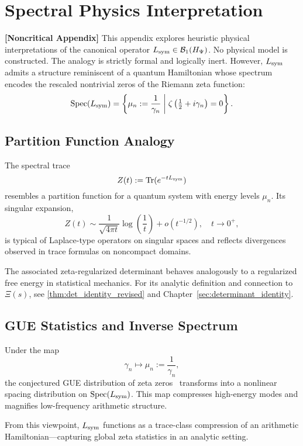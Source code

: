 \section{Spectral Physics Interpretation}
\label{app:spectral_physics_link}

\noindent\textbf{[Noncritical Appendix]}  
This appendix explores heuristic physical interpretations of the canonical operator \( L_{\mathrm{sym}} \in \mathcal{B}_1(H_{\Psi}) \). No physical model is constructed. The analogy is strictly formal and logically inert. However, \( L_{\mathrm{sym}} \) admits a structure reminiscent of a quantum Hamiltonian whose spectrum encodes the rescaled nontrivial zeros of the Riemann zeta function:
\[
\operatorname{Spec}(L_{\mathrm{sym}}) = \left\{ \mu_n := \frac{1}{\gamma_n} \;\middle|\; \zeta\left(\tfrac{1}{2} + i\gamma_n\right) = 0 \right\}.
\]

\subsection*{Partition Function Analogy}

The spectral trace
\[
Z(t) := \operatorname{Tr}(e^{-t L_{\mathrm{sym}}})
\]
resembles a partition function for a quantum system with energy levels \( \mu_n \). Its singular expansion,
\[
Z(t) \sim \frac{1}{\sqrt{4\pi t}} \log\left( \frac{1}{t} \right) + o(t^{-1/2}), \quad t \to 0^+,
\]
is typical of Laplace-type operators on singular spaces and reflects divergences observed in trace formulas on noncompact domains.

The associated zeta-regularized determinant behaves analogously to a regularized free energy in statistical mechanics. For its analytic definition and connection to \( \Xi(s) \), see \cref{thm:det_identity_revised} and Chapter~\ref{sec:determinant_identity}.

\subsection*{GUE Statistics and Inverse Spectrum}

Under the map
\[
\gamma_n \longmapsto \mu_n := \frac{1}{\gamma_n},
\]
the conjectured GUE distribution of zeta zeros~\cite{Montgomery1973PairCorrelation, Berry1986RiemannSpectra} transforms into a nonlinear spacing distribution on \( \operatorname{Spec}(L_{\mathrm{sym}}) \). This map compresses high-energy modes and magnifies low-frequency arithmetic structure.

From this viewpoint, \( L_{\mathrm{sym}} \) functions as a trace-class compression of an arithmetic Hamiltonian—capturing global zeta statistics in an analytic setting.

